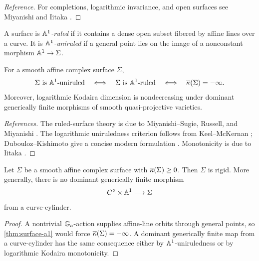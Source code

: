 \begin{proof}[Reference]
For completions, logarithmic invariance, and open surfaces see Miyanishi \cite[Chapters 1--2]{Miyanishi2001} and Iitaka \cite{Iitaka1977}.
\end{proof}

\begin{definition}\label{def:a1-ruled}
A surface is \emph{$\mathbb A^1$-ruled} if it contains a dense open subset fibered by affine lines over a curve.  It is \emph{$\mathbb A^1$-uniruled} if a general point lies on the image of a nonconstant morphism $\mathbb A^1\to\Sigma$.
\end{definition}

\begin{recalledtheorem}\label{thm:surface-a1}
For a smooth affine complex surface $\Sigma$,
\begin{equation}\label{eq:surface-line-equivalence}
  \Sigma\text{ is $\mathbb A^1$-uniruled}
  \quad\Longleftrightarrow\quad
  \Sigma\text{ is $\mathbb A^1$-ruled}
  \quad\Longleftrightarrow\quad
  \overline\kappa(\Sigma)=-\infty.
\end{equation}
Moreover, logarithmic Kodaira dimension is nondecreasing under dominant generically finite morphisms of smooth quasi-projective varieties.
\end{recalledtheorem}

\begin{proof}[References]
The ruled-surface theory is due to Miyanishi--Sugie, Russell, and Miyanishi \cite{MiyanishiSugie1980,Russell1981,Miyanishi1982}.  The logarithmic uniruledness criterion follows from Keel--McKernan \cite[Theorem 1.1]{KeelMcKernan1999}; Dubouloz--Kishimoto give a concise modern formulation \cite[Introduction]{DuboulozKishimoto2015}.  Monotonicity is due to Iitaka \cite{Iitaka1977}.
\end{proof}

\begin{corollary}\label{cor:surface-rigidity}
Let $\Sigma$ be a smooth affine complex surface with $\overline\kappa(\Sigma)\geq0$.  Then $\Sigma$ is rigid.  More generally, there is no dominant generically finite morphism
\[
  C^{\circ}\times\mathbb A^1\longrightarrow\Sigma
\]
from a curve-cylinder.
\end{corollary}

\begin{proof}
A nontrivial $\mathbb G_a$-action supplies affine-line orbits through general points, so \cref{thm:surface-a1} would force $\overline\kappa(\Sigma)=-\infty$.  A dominant generically finite map from a curve-cylinder has the same consequence either by $\mathbb A^1$-uniruledness or by logarithmic Kodaira monotonicity.
\end{proof}

